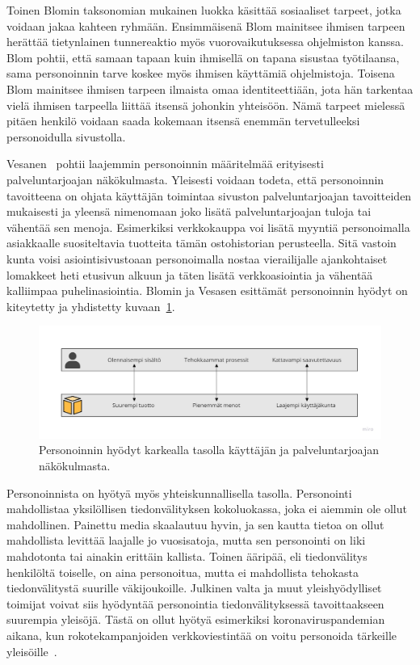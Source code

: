 \documentclass[finnish, 12pt, a4paper, elec, utf8, a-1b]{aaltothesis}
\begin{document}
Toinen Blomin taksonomian mukainen luokka käsittää sosiaaliset tarpeet, jotka
voidaan jakaa kahteen ryhmään. Ensimmäisenä Blom mainitsee ihmisen tarpeen
herättää tietynlainen tunnereaktio myös vuorovaikutuksessa ohjelmiston kanssa.
Blom pohtii, että samaan tapaan kuin ihmisellä on tapana sisustaa työtilaansa,
sama personoinnin tarve koskee myös ihmisen käyttämiä ohjelmistoja. Toisena Blom
mainitsee ihmisen tarpeen ilmaista omaa identiteettiään, jota hän tarkentaa
vielä ihmisen tarpeella liittää itsensä johonkin yhteisöön. Nämä tarpeet
mielessä pitäen henkilö voidaan saada kokemaan itsensä enemmän tervetulleeksi
personoidulla sivustolla.

Vesanen~\cite{10.1108/03090560710737534} pohtii laajemmin personoinnin
määritelmää erityisesti palveluntarjoajan näkökulmasta. Yleisesti voidaan
todeta, että personoinnin tavoitteena on ohjata käyttäjän toimintaa sivuston
palveluntarjoajan tavoitteiden mukaisesti ja yleensä nimenomaan joko lisätä
palveluntarjoajan tuloja tai vähentää sen menoja. Esimerkiksi verkkokauppa voi
lisätä myyntiä personoimalla asiakkaalle suositeltavia tuotteita tämän
ostohistorian perusteella. Sitä vastoin kunta voisi asiointisivustoaan
personoimalla nostaa vierailijalle ajankohtaiset lomakkeet heti etusivun alkuun
ja täten lisätä verkkoasiointia ja vähentää kalliimpaa puhelinasiointia. Blomin
ja Vesasen esittämät personoinnin hyödyt on kiteytetty ja yhdistetty
kuvaan~\ref{fig:personalization-benefits}.

\begin{figure}[h]
    \centering
    \includegraphics[width=\textwidth]{images/personalization-benefits.jpg}
    \caption{Personoinnin hyödyt karkealla tasolla käyttäjän ja
    palveluntarjoajan näkökulmasta.~\label{fig:personalization-benefits}}
\end{figure}

Personoinnista on hyötyä myös yhteiskunnallisella tasolla. Personointi
mahdollistaa yksilöllisen tiedonvälityksen kokoluokassa, joka ei aiemmin ole
ollut mahdollinen. Painettu media skaalautuu hyvin, ja sen kautta tietoa on
ollut mahdollista levittää laajalle jo vuosisatoja, mutta sen personointi on
liki mahdotonta tai ainakin erittäin kallista. Toinen ääripää, eli tiedonvälitys
henkilöltä toiselle, on aina personoitua, mutta ei mahdollista tehokasta
tiedonvälitystä suurille väkijoukoille. Julkinen valta ja muut yleishyödylliset
toimijat voivat siis hyödyntää personointia tiedonvälityksessä tavoittaakseen
suurempia yleisöjä. Tästä on ollut hyötyä esimerkiksi koronaviruspandemian
aikana, kun rokotekampanjoiden verkkoviestintää on voitu personoida tärkeille
yleisöille~\cite{sanchez_2022}.
\end{document}
